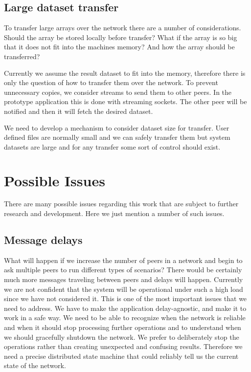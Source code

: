 \subsection{Large dataset transfer}
To transfer large arrays over the network there are a number of considerations. 
Should the array be stored locally before transfer?
What if the array is so big that it does not fit into the machines memory? 
And how the array should be transferred?

Currently we assume the result dataset to fit into the memory, 
therefore there is only the question of how to transfer them over the network. 
To prevent unnecessary copies, we consider streams to send them to other peers. 
In the prototype application this is done with streaming sockets. 
The other peer will be notified and then it will fetch the desired dataset.

We need to develop a mechanism to consider dataset size for transfer. 
User defined files are normally small and we can safely transfer them but
system datasets are large and for any transfer some sort of control should exist.

\section{Possible Issues}
There are many possible issues regarding this work that are subject to further research and development.
Here we just mention a number of such issues.
\subsection{Message delays}
What will happen if we increase the number of peers in a network and begin to ask multiple
peers to run different types of scenarios? There would be certainly much more messages
traveling between peers and delays will happen. Currently we are not confident that the system
will be operational under such a high load since we have not considered it.
This is one of the most important issues that we need to address. We have to make the 
application delay-agnostic, and make it to work in a safe way. We need to be able to 
recognize when the network is reliable and when it should stop processing further operations and
to understand when we should gracefully shutdown the network. We prefer to deliberately stop 
the operations rather than creating unexpected and confusing results. Therefore we need a precise
distributed state machine that could reliably tell us the current state of the network.

